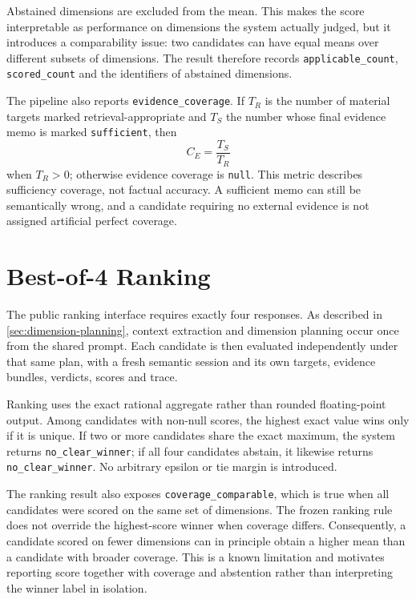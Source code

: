 Abstained dimensions are excluded from the mean. This makes the score interpretable as performance on dimensions the system actually judged, but it introduces a comparability issue: two candidates can have equal means over different subsets of dimensions. The result therefore records \texttt{applicable\_count}, \texttt{scored\_count} and the identifiers of abstained dimensions.

The pipeline also reports \texttt{evidence\_coverage}. If $T_R$ is the number of material targets marked retrieval-appropriate and $T_S$ the number whose final evidence memo is marked \texttt{sufficient}, then
\begin{equation}
C_E = \frac{T_S}{T_R}
\end{equation}
when $T_R>0$; otherwise evidence coverage is \texttt{null}. This metric describes sufficiency coverage, not factual accuracy. A sufficient memo can still be semantically wrong, and a candidate requiring no external evidence is not assigned artificial perfect coverage.

\section{Best-of-4 Ranking}
\label{sec:bestof4-ranking}

The public ranking interface requires exactly four responses. As described in \cref{sec:dimension-planning}, context extraction and dimension planning occur once from the shared prompt. Each candidate is then evaluated independently under that same plan, with a fresh semantic session and its own targets, evidence bundles, verdicts, scores and trace.

Ranking uses the exact rational aggregate rather than rounded floating-point output. Among candidates with non-null scores, the highest exact value wins only if it is unique. If two or more candidates share the exact maximum, the system returns \texttt{no\_clear\_winner}; if all four candidates abstain, it likewise returns \texttt{no\_clear\_winner}. No arbitrary epsilon or tie margin is introduced.

The ranking result also exposes \texttt{coverage\_comparable}, which is true when all candidates were scored on the same set of dimensions. The frozen ranking rule does not override the highest-score winner when coverage differs. Consequently, a candidate scored on fewer dimensions can in principle obtain a higher mean than a candidate with broader coverage. This is a known limitation and motivates reporting score together with coverage and abstention rather than interpreting the winner label in isolation.

